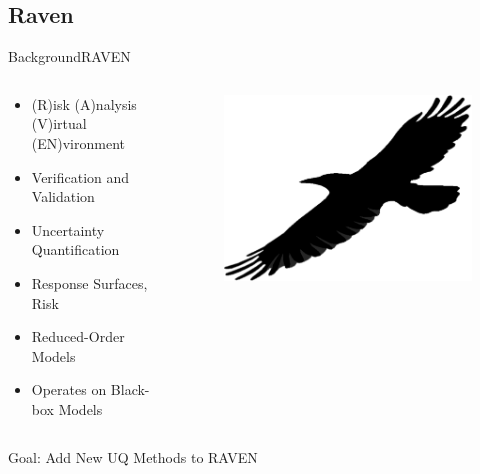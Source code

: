 \documentclass{beamer}
\begin{document}
\subsection{Raven}
\begin{frame}{Background}{RAVEN}\vspace{-20pt}
  \begin{columns}
    \begin{column}{0.8\linewidth}
  \begin{itemize}
    \item (R)isk (A)nalysis (V)irtual (EN)vironment
    \item Verification and Validation
    \item Uncertainty Quantification
    \item Response Surfaces, Risk
    \item Reduced-Order Models
    \item Operates on Black-box Models
  \end{itemize}
    \end{column}
    \begin{column}{0.2\linewidth}
    \begin{figure}[h!]
      \centering
        \includegraphics[width=\textwidth]{../../graphics/raven}
      \end{figure} \vspace{-20pt}
    \end{column}
  \end{columns}\vspace{10pt}
  Goal: Add New UQ Methods to RAVEN
\end{frame}
\end{document}
